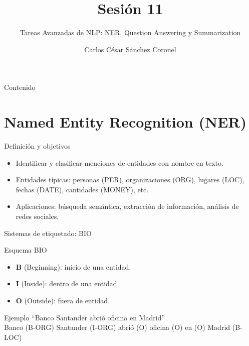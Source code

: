 \documentclass[aspectratio=169, 10pt, xcolor=table]{beamer}
\title[SESIÓN 11 NLP]{\textbf{Sesión 11}}
\subtitle{Tareas Avanzadas de NLP: NER, Question Answering y Summarization}
\author[Prof. C. Sánchez]{Carlos César Sánchez Coronel}
\institute{\textbf{NLP}}
\date{}
\begin{document}
\begin{frame}
    \titlepage
\end{frame}

\begin{frame}{Contenido}
    \tableofcontents
\end{frame}

\section{Named Entity Recognition (NER)}

\begin{frame}{Definición y objetivos}
    \begin{itemize}
        \item Identificar y clasificar menciones de entidades con nombre en texto.
        \item Entidades típicas: personas (PER), organizaciones (ORG), lugares (LOC), fechas (DATE), cantidades (MONEY), etc.
        \item Aplicaciones: búsqueda semántica, extracción de información, análisis de redes sociales.
    \end{itemize}
\end{frame}

\begin{frame}{Sistemas de etiquetado: BIO}
    \begin{block}{Esquema BIO}
        \begin{itemize}
            \item \textbf{B} (Beginning): inicio de una entidad.
            \item \textbf{I} (Inside): dentro de una entidad.
            \item \textbf{O} (Outside): fuera de entidad.
        \end{itemize}
    \end{block}
    \begin{exampleblock}{Ejemplo}
        ``Banco Santander abrió oficina en Madrid'' \\
        \vspace{0.2cm}
        Banco (B-ORG) Santander (I-ORG) abrió (O) oficina (O) en (O) Madrid (B-LOC)
    \end{exampleblock}
\end{frame}
\end{document}
